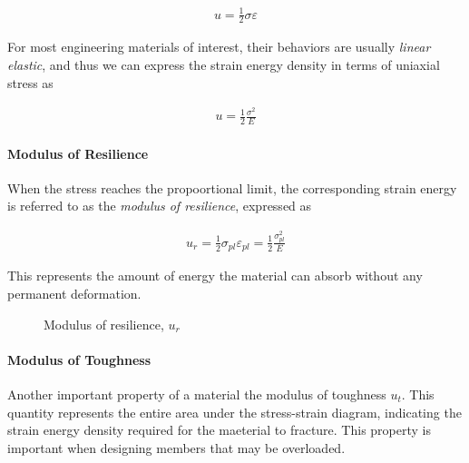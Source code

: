 \documentclass[
10pt,
a4paper,
openany,
svgnames,
]{kaobook} %
\begin{document}
\begin{align}
  \label{eq: strain energy density}
  u = \frac{1}{2}\sigma\varepsilon
\end{align}

For most engineering materials of interest, their behaviors are usually \emph{linear elastic}, and thus we can express the strain energy density in terms of uniaxial stress as

\begin{align}
  \label{eq: strain energy density - linear elastic}
  u = \frac{1}{2}\frac{\sigma^2}{E}
\end{align}

\paragraph{Modulus of Resilience} When the stress reaches the propoortional limit, the corresponding strain energy is referred to as the \emph{modulus of resilience}, expressed as

\begin{align}
  \label{eq: modulus of resilience}
  u_r = \frac{1}{2}\sigma_{pl}\varepsilon_{pl} = \frac{1}{2}\frac{\sigma_{pl}^2}{E}
\end{align}

This represents the amount of energy the material can absorb without any permanent deformation.

\begin{figure}[H]
  \centering
  \caption{Modulus of resilience, $u_r$}
  \label{fig: modulus of toughness}
\end{figure}

\paragraph{Modulus of Toughness} Another important property of a material the modulus of toughness $u_t$. This quantity represents the entire area under the stress-strain diagram, indicating the strain energy density required for the maeterial to fracture. This property is important when designing members that may be overloaded.
\end{document}
